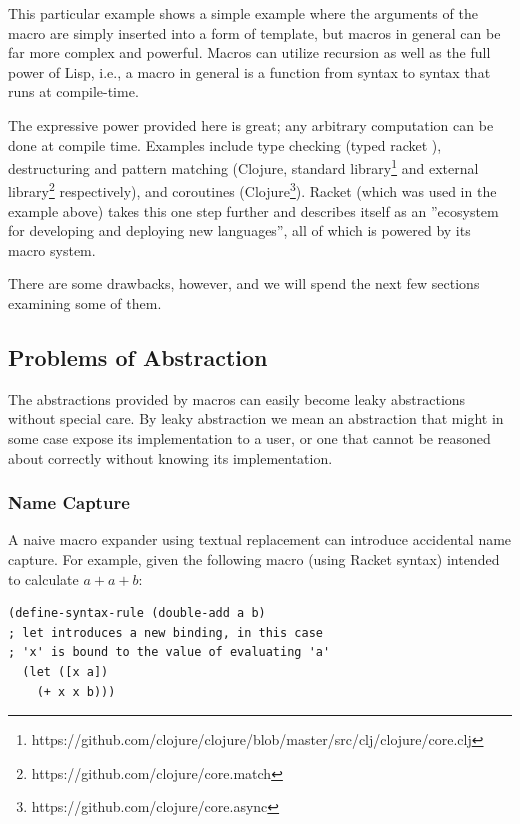 \documentclass{kththesis}
\begin{document}
This particular example shows a simple example where the arguments of the macro are simply inserted into a form of template, but macros in general can be far more complex and powerful. Macros can utilize recursion as well as the full power of Lisp, i.e., a macro in general is a function from syntax to syntax that runs at compile-time.

The expressive power provided here is great; any arbitrary computation can be done at compile time. Examples include type checking (typed racket \cite{Tobin-Hochstadt:2011:LL:1993498.1993514}), destructuring and pattern matching (Clojure, standard library\footnote{https://github.com/clojure/clojure/blob/master/src/clj/clojure/core.clj} and external library\footnote{https://github.com/clojure/core.match} respectively), and coroutines (Clojure\footnote{https://github.com/clojure/core.async}). Racket (which was used in the example above) takes this one step further and describes itself as an ''ecosystem for developing and deploying new languages'', all of which is powered by its macro system.

There are some drawbacks, however, and we will spend the next few sections examining some of them.

\subsection{Problems of Abstraction} \label{sec:problem-abstraction}

The abstractions provided by macros can easily become leaky abstractions without special care. By leaky abstraction we mean an abstraction that might in some case expose its implementation to a user, or one that cannot be reasoned about correctly without knowing its implementation.

\subsubsection{Name Capture}

A naive macro expander using textual replacement can introduce accidental name capture. For example, given the following macro (using Racket syntax) intended to calculate $a + a + b$:

\begin{verbatim}
(define-syntax-rule (double-add a b)
; let introduces a new binding, in this case
; 'x' is bound to the value of evaluating 'a'
  (let ([x a])
    (+ x x b)))
\end{verbatim}
\end{document}
